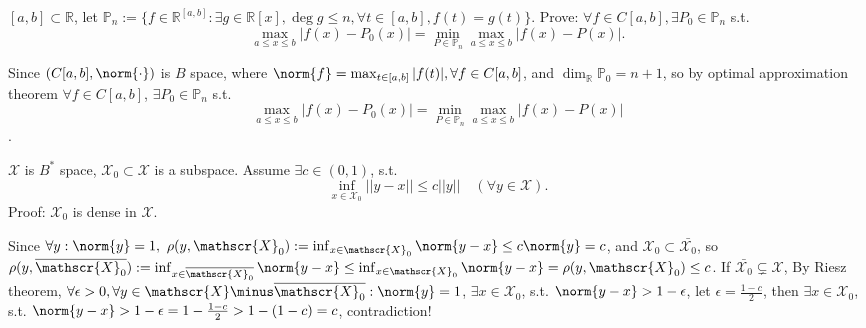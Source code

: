 \documentclass{ctexart}
\begin{document}
\begin{problem}
    $[a,b]\subset \mathbb{R}$, let $\mathbb{P}_n:=\{f\in \mathbb{R}^{[a,b]}:\exists g\in \mathbb{R}[x],\deg g\leq n,\forall t\in[a,b], f(t)=g(t)\}$. Prove: $\forall f\in C[a,b], \exists P_0\in \mathbb{P}_n$ s.t. 
    \begin{equation}
        \max_{a\leq x\leq b}|f(x)-P_0(x)|=\min_{P\in \mathbb{P}_n}\max_{a\leq x\leq b}|f(x)-P(x)|.
    \end{equation}
\end{problem}
\begin{solution}
    Since $(C[a,b],\norm{\cdot})$ is $B$ space, where $\norm{f}=\max_{t\in[a,b]}|f(t)|, \forall f\in C[a,b]$, and $\dim_{\mathbb{R}}\mathbb{P}_0=n+1$, so by optimal approximation theorem $\forall f\in C[a,b]$, $\exists P_0\in \mathbb{P}_n$ s.t. 
    \begin{equation}
        \max_{a\leq x\leq b}|f(x)-P_0(x)|=\min_{P\in \mathbb{P}_n}\max_{a\leq x\leq b}|f(x)-P(x)|
    \end{equation}.
\end{solution}


\begin{problem}
    $\mathscr{X}$ is $B^*$ space, $\mathscr{X}_0\subset \mathscr{X}$ is a subspace. Assume $\exists c\in(0,1)$, s.t. 
    \begin{equation}
        \inf_{x\in \mathscr{X}_0}||y-x||\leq c||y||\quad(\forall y\in \mathscr{X}).
    \end{equation}
    Proof: $\mathscr{X}_0$ is dense in $\mathscr{X}$.
\end{problem}
\begin{solution}
    Since $\forall y:\norm{y}=1,\ \rho(y,\mathscr{X}_0):=\inf_{x\in \mathscr{X}_0}\norm{y-x}\leq c\norm{y}=c$, and $\mathscr{X}_0\subset \bar{\mathscr{X}_0}$, so $\rho(y,\overline{\mathscr{X}_0}):=\inf_{x\in \bar{\mathscr{X}_0}}\norm{y-x}\leq\inf_{x\in \mathscr{X}_0}\norm{y-x}=\rho(y,\mathscr{X}_0)\leq c$. If $\bar{\mathscr{X}_0}\subsetneq \mathscr{X}$, By Riesz theorem, $\forall \epsilon>0,\forall y\in \mathscr{X}\minus\bar{\mathscr{X}_0}:\norm{y}=1$, $\exists x\in \mathscr{X}_0$, s.t. $\norm{y-x}>1-\epsilon$, let $\epsilon=\frac{1-c}{2}$, then $\exists x\in \mathscr{X}_0$, s.t. $\norm{y-x}>1-\epsilon=1-\frac{1-c}{2}>1-(1-c)=c$, contradiction!
\end{solution}
\end{document}
